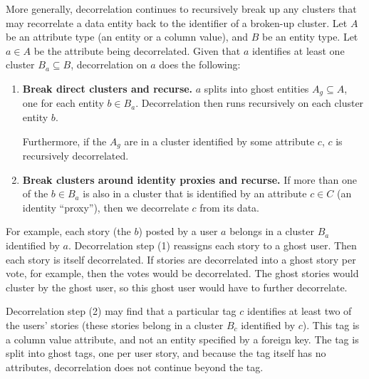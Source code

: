 More generally, decorrelation continues to recursively break up any clusters that may recorrelate a
data entity back to the identifier of a broken-up cluster. Let $A$ be an attribute type (an entity
or a column value), and $B$ be an entity type. Let $a
\in A$ be the attribute being decorrelated. Given that $a$ identifies at least one cluster $B_a
\subseteq B$, decorrelation on $a$ does the following: 
\begin{enumerate} 
    \item \textbf{Break direct clusters and
            recurse.} $a$ splits into ghost entities $A_g \subseteq A$, one for each entity $b\in B_a$.
            Decorrelation then runs recursively on each cluster entity $b$.
            
            Furthermore, if the $A_g$ are in a cluster identified by some attribute $c$, $c$ is
            recursively decorrelated.
    \item \textbf{Break clusters around identity proxies and recurse.} If more than one of the
        $b \in B_a$ is also in a cluster that is identified by an attribute $c \in C$ (an identity
        ``proxy''), then we decorrelate $c$ from its data. 
        
\end{enumerate}
For example, each story (the $b$) posted by a user $a$ belongs in a cluster $B_a$ identified by $a$.
Decorrelation step (1) reassigns each story to a ghost user. Then each story is itself decorrelated.
If stories are decorrelated into a ghost story per vote, for example, then the votes would be
decorrelated. The ghost stories would cluster by the ghost user, so this ghost user would have to
further decorrelate.

Decorrelation step (2) may find that a particular tag $c$ identifies at least two of the users'
stories (these stories belong in a cluster $B_c$ identified by $c$). This tag is a column value
attribute, and not an entity specified by a foreign key. The tag is split into ghost tags, one per
user story, and because the tag itself has no attributes, decorrelation does not continue beyond the
tag.
\fi

